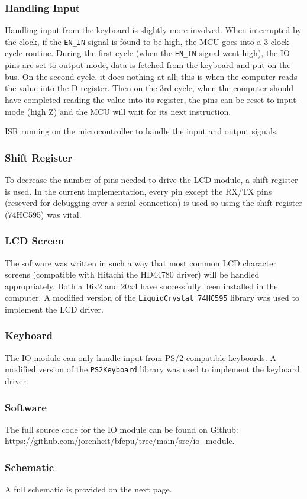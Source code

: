 \subsubsection{Handling Input}
Handling input from the keyboard is slightly more involved. When interrupted by the clock, if the \texttt{EN\_IN} signal is found to be high, the MCU goes into a 3-clock-cycle routine. During the first cycle (when the \texttt{EN\_IN} signal went high), the IO pins are set to output-mode, data is fetched from the keyboard and put on the bus. On the second cycle, it does nothing at all; this is when the computer reads the value into the D register. Then on the 3rd cycle, when the computer should have completed reading the value into its register, the pins can be reset to input-mode (high Z) and the MCU will wait for its next instruction.

\begin{lstfloat}[H]
  
  \caption{ISR running on the microcontroller to handle the input and output signals.}
  \label{lst:io_isr}
\end{lstfloat}

\subsubsection{Shift Register}
To decrease the number of pins needed to drive the LCD module, a shift register is used. In the current implementation, every pin except the RX/TX pins (reseverd for debugging over a serial connection) is used so using the shift register (74HC595) was vital.

\subsubsection{LCD Screen}
The software was written in such a way that most common LCD character screens (compatible with Hitachi the HD44780 driver) will be handled appropriately. Both a 16x2 and 20x4 have successfully been installed in the computer. A modified version of the \texttt{LiquidCrystal\_74HC595} library was used to implement the LCD driver.

\subsubsection{Keyboard}
The IO module can only handle input from PS/2 compatible keyboards. A modified version of the \texttt{PS2Keyboard} library was used to implement the keyboard driver.

\subsubsection{Software}
The full source code for the IO module can be found on Github: \url{https://github.com/jorenheit/bfcpu/tree/main/src/io_module}.


\subsubsection{Schematic}
A full schematic is provided on the next page.


